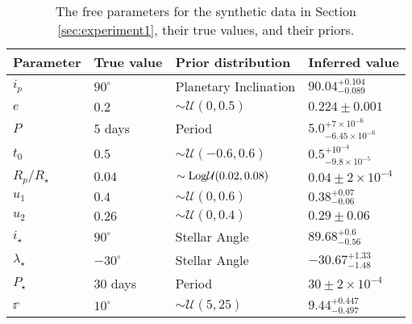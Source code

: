 \documentclass[twocolumn]{aastex631}
\begin{document}
\begin{table}[]
    \vspace{0.5cm}
    \centering
    \caption{The free parameters for the synthetic data in Section \ref{sec:experiment1}, their true values, and their priors.}
    \begin{tabular}{llll}
    \hline
    Parameter                                 & True value            & Prior distribution                   & Inferred value    \\ \hline\hline
    $i_p$                                     & $90^\circ$            & Planetary Inclination                & $90.04^{+0.104}_{-0.089}$                   \\
    $e$                                       & $0.2$                 & $\sim\mathcal{U}(0, 0.5)$            & $0.224 \pm 0.001$                     \\
    $P$                                       & $5$ days              & Period                               & $5.0^{+7\times10^{-6}}_{-6.45\times10^{-6}}$                       \\
    $t_0$                                     & $0.5$                 & $\sim\mathcal{U}(-0.6, 0.6)$         & $0.5^{+10^{-4}}_{-9.8\times10^{-5}}$                       \\
    $R_p / R_\star$                           & $0.04$                & $\sim \rm Log \mathcal{U}(0.02, 0.08)$ & $0.04 \pm 2\times10^{-4}$                         \\ 
    $u_1$                                     & $0.4$                 & $\sim\mathcal{U}(0, 0.6)$            & $0.38^{+0.07}_{-0.06}$                         \\ 
    $u_2$                                     & $0.26$                & $\sim\mathcal{U}(0, 0.4)$            & $0.29 \pm 0.06$                         \\ \hline
    $i_\star$                                 & $90^\circ$            & Stellar Angle                        & $89.68^{+0.6}_{-0.56}$                      \\
    $\lambda_\star$                           & $-30^\circ$           & Stellar Angle                        & $-30.67^{+1.33}_{-1.48}$                           \\
    $P_\star$                                 & $30$ days             & Period                               & $30\pm 2 \times10^{-4}$                       \\ \hline
    $\mathbb{r}$                              & $10^\circ$            & $\sim\mathcal{U}(5, 25)$             & $9.44^{+0.447}_{-0.497}$                           \\

\end{tabular}
\end{table}
\end{document}
